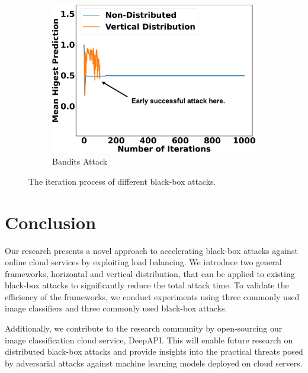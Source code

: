 \begin{figure}[bph]
\begin{subfigure}[b]{0.32\textwidth}
    \includegraphics[width=\textwidth]{figures/chapter_classification/bandits_attack_vertical_margin.png}
    \caption{Bandits Attack}
    \label{fig:bandits_plot}
\end{subfigure}
\caption{The iteration process of different black-box attacks.}
\label{fig.vertical_plot}
\end{figure}


\section{Conclusion}


Our research presents a novel approach to accelerating black-box attacks against online cloud services by exploiting load balancing. We introduce two general frameworks, horizontal and vertical distribution, that can be applied to existing black-box attacks to significantly reduce the total attack time. To validate the efficiency of the frameworks, we conduct experiments using three commonly used image classifiers and three commonly used black-box attacks.

Additionally, we contribute to the research community by open-sourcing our image classification cloud service, DeepAPI. This will enable future research on distributed black-box attacks and provide insights into the practical threats posed by adversarial attacks against machine learning models deployed on cloud servers.



